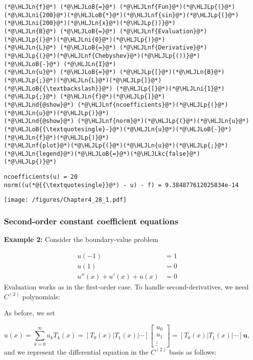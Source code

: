 \documentclass[12pt,landscape]{article}
\newcommand{\HLJLkc}[1]{\textcolor[RGB]{59,151,46}{\textit{#1}}}
\newcommand{\HLJLn}[1]{#1}
\newcommand{\HLJLnd}[1]{\textcolor[RGB]{214,102,97}{#1}}
\newcommand{\HLJLnf}[1]{\textcolor[RGB]{66,102,213}{#1}}
\newcommand{\HLJLni}[1]{\textcolor[RGB]{59,151,46}{#1}}
\newcommand{\HLJLoB}[1]{\textcolor[RGB]{102,102,102}{\textbf{#1}}}
\newcommand{\HLJLp}[1]{#1}
\begin{document}
{\begin{lstlisting}
(*@\HLJLn{f}@*) (*@\HLJLoB{=}@*) (*@\HLJLnf{Fun}@*)(*@\HLJLp{(}@*)(*@\HLJLni{200}@*)(*@\HLJLoB{*}@*)(*@\HLJLnf{sin}@*)(*@\HLJLp{(}@*)(*@\HLJLni{200}@*)(*@\HLJLn{x}@*)(*@\HLJLp{))}@*)
(*@\HLJLn{B}@*) (*@\HLJLoB{=}@*) (*@\HLJLnf{Evaluation}@*)(*@\HLJLp{(}@*)(*@\HLJLni{0}@*)(*@\HLJLp{)}@*)
(*@\HLJLn{L}@*) (*@\HLJLoB{=}@*) (*@\HLJLnf{Derivative}@*)(*@\HLJLp{(}@*)(*@\HLJLnf{Chebyshev}@*)(*@\HLJLp{())}@*) (*@\HLJLoB{-}@*) (*@\HLJLn{I}@*)
(*@\HLJLn{u}@*) (*@\HLJLoB{=}@*) (*@\HLJLp{[}@*)(*@\HLJLn{B}@*)(*@\HLJLp{;}@*)(*@\HLJLn{L}@*)(*@\HLJLp{]}@*) (*@\HLJLoB{{\textbackslash}}@*) (*@\HLJLp{[}@*)(*@\HLJLni{1}@*)(*@\HLJLp{;}@*) (*@\HLJLn{f}@*)(*@\HLJLp{]}@*)
(*@\HLJLnd{@show}@*) (*@\HLJLnf{ncoefficients}@*)(*@\HLJLp{(}@*)(*@\HLJLn{u}@*)(*@\HLJLp{)}@*)
(*@\HLJLnd{@show}@*) (*@\HLJLnf{norm}@*)(*@\HLJLp{(}@*)(*@\HLJLn{u}@*)(*@\HLJLoB{{\textquotesingle}-}@*)(*@\HLJLn{u}@*)(*@\HLJLoB{-}@*)(*@\HLJLn{f}@*)(*@\HLJLp{)}@*)
(*@\HLJLnf{plot}@*)(*@\HLJLp{(}@*)(*@\HLJLn{u}@*)(*@\HLJLp{;}@*)(*@\HLJLn{legend}@*)(*@\HLJLoB{=}@*)(*@\HLJLkc{false}@*)(*@\HLJLp{)}@*)
\end{lstlisting}

\begin{lstlisting}
ncoefficients(u) = 20
norm((u(*@{{\textquotesingle}}@*) - u) - f) = 9.384877612025834e-14
\end{lstlisting}

\texttt{[image: /figures/Chapter4\_28\_1.pdf]}

\subsubsection{Second-order constant coefficient equations}
\textbf{Example 2:}   Consider the boundary-value problem


\begin{align*}
u(-1) &= 1\\
u(1) &= 0\\
u''(x) + u'(x)  + u(x) &= 0
\end{align*}
Evaluation works as in the first-order case. To handle second-derivatives, we need $C^{(2)}$ polynomials:

As before, we set

\[
u(x) = \sum_{k=0}^\infty u_k T_k(x) = \left[ T_0(x) | T_1(x) | \cdots \right] \begin{bmatrix} u_0 \\ u_1 \\ \vdots \end{bmatrix}=  \left[ T_0(x) | T_1(x) | \cdots \right] \mathbf{u},
\]
and we represent the differential equation in the $C^{(2)}$ basis as follows:


}
\end{document}
